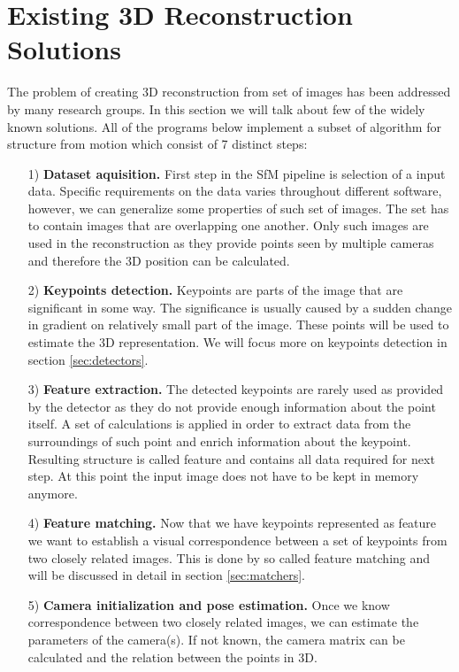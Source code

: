 \section{Existing 3D Reconstruction Solutions}
\label{sec:existing_3D_reconstruction_solutions}
The problem of creating 3D reconstruction from set of images has been addressed by many research groups. In this section we will talk about few of the widely known solutions. All of the programs below implement a subset of algorithm for structure from motion which consist of 7 distinct steps:
\begin{itemize}
	\item[1)] \textbf{Dataset aquisition.} First step in the SfM pipeline is selection of a input data. Specific requirements on the data varies throughout different software, however, we can generalize some properties of such set of images. The set has to contain images that are overlapping one another. Only such images are used in the reconstruction as they provide points seen by multiple cameras and therefore the 3D position can be calculated.
	\item[2)] \textbf{Keypoints detection.} Keypoints are parts of the image that are significant in some way. The significance is usually caused by a sudden change in gradient on relatively small part of the image. These points will be used to estimate the 3D representation. We will focus more on keypoints detection in section \ref{sec:detectors}. 
	\item[3)] \textbf{Feature extraction.} The detected keypoints are rarely used as provided by the detector as they do not provide enough information about the point itself. A set of calculations is applied in order to extract data from the surroundings of such point and enrich information about the keypoint. Resulting structure is called feature and contains all data required for next step. At this point the input image does not have to be kept in memory anymore.
	\item[4)] \textbf{Feature matching.} Now that we have keypoints represented as feature we want to establish a visual correspondence between a set of keypoints from two closely related images. This is done by so called feature matching and will be discussed in detail in section \ref{sec:matchers}.
	\item[5)] \textbf{Camera initialization and pose estimation.} Once we know correspondence between two closely related images, we can estimate the parameters of the camera(s). If not known, the camera matrix can be calculated and the relation between the points in 3D.

\end{itemize}
